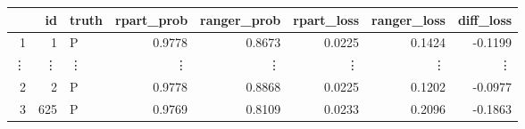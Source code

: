 \begin{table}[ht]
\centering
\begin{tabular}{rrlrrrrr}
  \hline
 & id & truth & rpart\_prob & ranger\_prob & rpart\_loss & ranger\_loss & diff\_loss \\
  \hline
1 &     1 & P & 0.9778 & 0.8673 & 0.0225 & 0.1424 & -0.1199 \\
\vdots &     \vdots & \vdots & \vdots & \vdots & \vdots & \vdots & \vdots \\
  2 &     2 & P & 0.9778 & 0.8868 & 0.0225 & 0.1202 & -0.0977 \\
  3 &   625 & P & 0.9769 & 0.8109 & 0.0233 & 0.2096 & -0.1863 \\
   \hline
\end{tabular}
\end{table}
